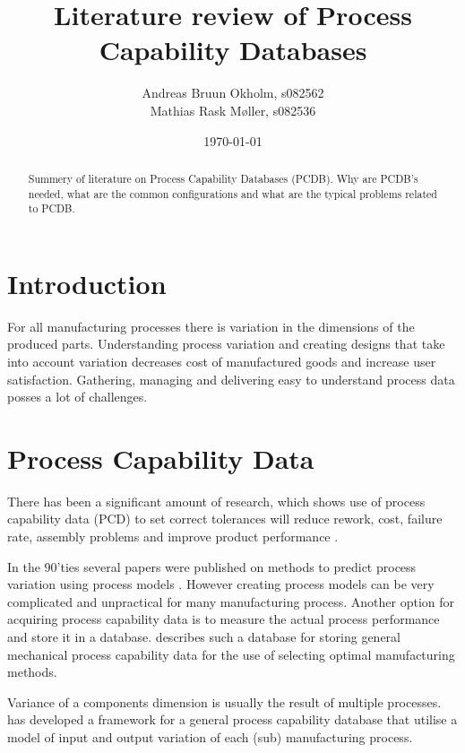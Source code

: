 \documentclass[aip,amsmath,reprint, author-year]{revtex4-1}
\begin{document}
\begin{abstract}
Summery of literature on Process Capability Databases (PCDB). Why are PCDB's needed, what are the common configurations and what are the typical problems related to PCDB.
\end{abstract}

\title{Literature review of Process Capability Databases}
\author{Andreas Bruun Okholm, s082562\\
Mathias Rask Møller, s082536 }
 
\date{\today}
\maketitle


\section{Introduction}
For all manufacturing processes there is variation in the dimensions of the produced parts.
Understanding process variation and creating designs that take into account variation decreases cost of manufactured goods and increase user satisfaction. Gathering, managing and delivering easy to understand process data posses a lot of challenges.  




\section{Process Capability Data}
There has been a significant amount of research, which shows use of process capability data (PCD) to set correct tolerances will reduce rework, cost, failure rate, assembly problems and improve product performance \citep{tata1999process}.

In the 90'ties several papers were published on methods to predict process variation using process models \citep{thornton2000use}. However creating process models can be very complicated and unpractical for many manufacturing process. 
Another option for acquiring process capability data is to measure the actual process performance and store it in a database. \cite{perzyk1998selection} describes such a database for storing general mechanical process capability data for the use of selecting optimal manufacturing methods.

Variance of a components dimension is usually the result of multiple processes. 
 \cite{kern2003forecasting} has developed a framework for a general process capability database that utilise a model of input and output variation of each (sub) manufacturing process. 
\end{document}
